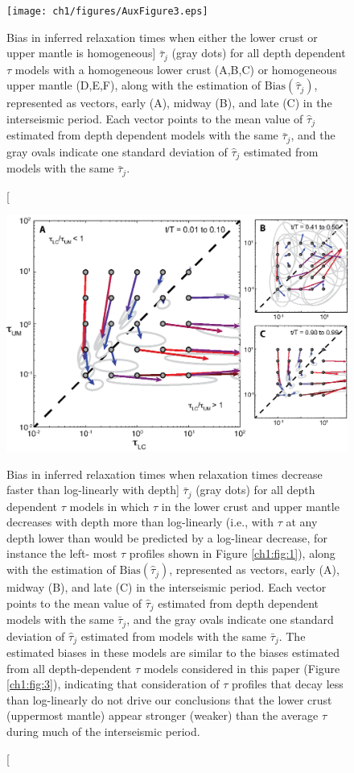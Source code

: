 \begin{figure}
\texttt{[image: ch1/figures/AuxFigure3.eps]}
\caption
[Bias in inferred relaxation times when either the lower crust or
upper mantle is homogeneous]
{$\bar{\tau}_j$ (gray dots) for all depth dependent $\tau$
models with a homogeneous lower crust (A,B,C) or homogeneous upper
mantle (D,E,F), along with the estimation of $\mathrm{Bias}(\hat{\tau}_j)$,
represented as vectors, early (A), midway (B), and late (C) in the
interseismic period.  Each vector points to the mean value of
$\hat{\tau}_j$ estimated from depth dependent models with the same
$\bar{\tau}_j$, and the gray ovals indicate one standard deviation of
$\hat{\tau}_j$ estimated from models with the same $\bar{\tau}_j$.}
\label{ch1:fig:A3}
\end{figure}

\begin{figure}
\includegraphics{ch1/figures/AuxFigure4.eps}
\caption
[Bias in inferred relaxation times when relaxation times decrease
faster than log-linearly with depth]
{$\bar{\tau}_j$ (gray dots) for all depth dependent $\tau$ models in
which $\tau$ in the lower crust and upper mantle decreases with depth
more than log-linearly (i.e., with $\tau$ at any depth lower than
would be predicted by a log-linear decrease, for instance the left-
most $\tau$ profiles shown in Figure \ref{ch1:fig:1}), along with the
estimation of $\mathrm{Bias}(\hat{\tau}_j)$, represented as vectors,
early (A), midway (B), and late (C) in the interseismic period.  Each
vector points to the mean value of $\hat{\tau}_j$ estimated from depth
dependent models with the same $\bar{\tau}_j$, and the gray ovals
indicate one standard deviation of $\hat{\tau}_j$ estimated from
models with the same $\bar{\tau}_j$.  The estimated biases in these
models are similar to the biases estimated from all depth-dependent
$\tau$ models considered in this paper (Figure \ref{ch1:fig:3}),
indicating that consideration of $\tau$ profiles that decay less than
log-linearly do not drive our conclusions that the lower crust
(uppermost mantle) appear stronger (weaker) than the average $\tau$
during much of the interseismic period.}
\label{ch1:fig:A4}
\end{figure}

